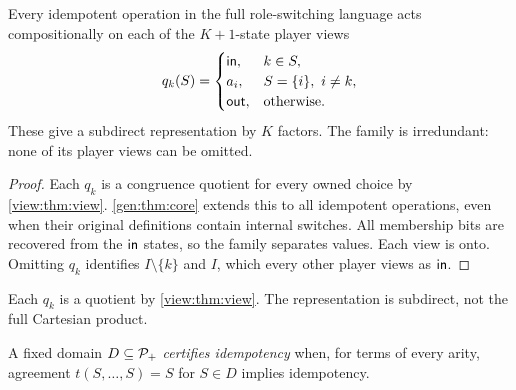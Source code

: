 \begin{corollary}\label{gen:cor:views}
Every idempotent operation in the full role-switching language acts
compositionally on each of the $K+1$-state player views
\[
 q_k(S)=
 \begin{cases}
 \mathsf{in},&k\in S,\\
 a_i,&S=\{i\},\ i\ne k,\\
 \mathsf{out},&\text{otherwise}.
 \end{cases}
\]
These give a subdirect representation by $K$ factors. The family is
irredundant: none of its player views can be omitted.
\end{corollary}
\begin{proof}
Each $q_k$ is a congruence quotient for every owned choice by \cref{view:thm:view}. \cref{gen:thm:core} extends this to all
idempotent operations, even when their original definitions contain
internal switches. All membership bits are recovered from the $\mathsf{in}$
states, so the family separates values. Each view is onto. Omitting
$q_k$ identifies $I\setminus\{k\}$ and $I$, which every other player
views as $\mathsf{in}$.
\end{proof}

Each $q_k$ is a quotient by \cref{view:thm:view}. The representation is subdirect, not the full Cartesian product.

A fixed domain $D\subseteq\mathcal P_+$ \emph{certifies idempotency} when, for terms of every arity, agreement $t(S,\ldots,S)=S$ for $S\in D$ implies idempotency.

